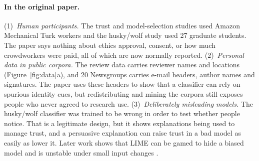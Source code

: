 \paragraph{In the original paper.} (1)~\emph{Human participants.} The trust and model-selection studies used Amazon Mechanical Turk workers and the husky/wolf study used 27 graduate students. The paper says nothing about ethics approval, consent, or how much crowdworkers were paid, all of which are now normally reported. (2)~\emph{Personal data in public corpora.} The review data carries reviewer names and locations (Figure~\ref{fig:data}a), and 20 Newsgroups carries e-mail headers, author names and signatures. The paper uses these headers to show that a classifier can rely on spurious identity cues, but redistributing and mining the corpora still exposes people who never agreed to research use. (3)~\emph{Deliberately misleading models.} The husky/wolf classifier was trained to be wrong in order to test whether people notice. That is a legitimate design, but it shows explanations being used to manage trust, and a persuasive explanation can raise trust in a bad model as easily as lower it. Later work shows that LIME can be gamed to hide a biased model \citep{slack2020} and is unstable under small input changes \citep{alvarezmelis2018}.

